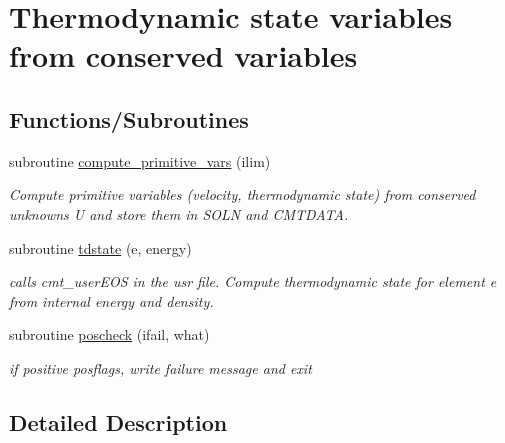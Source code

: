\hypertarget{group__state}{\section{Thermodynamic state variables from conserved variables}
\label{group__state}
}
\subsection*{Functions/\-Subroutines}
\begin{DoxyCompactItemize}
\item 
subroutine \hyperlink{group__state_ga150496cc6bdf94171d8f6822cd697145}{compute\-\_\-primitive\-\_\-vars} (ilim)
\begin{DoxyCompactList}\small\item\em Compute primitive variables (velocity, thermodynamic state) from conserved unknowns U and store them in S\-O\-L\-N and C\-M\-T\-D\-A\-T\-A. \end{DoxyCompactList}\item 
subroutine \hyperlink{group__state_ga91fd597ad604e7412e8d78a79beefe34}{tdstate} (e, energy)
\begin{DoxyCompactList}\small\item\em calls cmt\-\_\-user\-E\-O\-S in the usr file. Compute thermodynamic state for element e from internal energy and density. \end{DoxyCompactList}\item 
\hypertarget{group__state_ga9e9e837579897a93f40aae1fe6060255}{subroutine \hyperlink{group__state_ga9e9e837579897a93f40aae1fe6060255}{poscheck} (ifail, what)}\label{group__state_ga9e9e837579897a93f40aae1fe6060255}

\begin{DoxyCompactList}\small\item\em if positive posflags, write failure message and exit \end{DoxyCompactList}\end{DoxyCompactItemize}


\subsection{Detailed Description}


